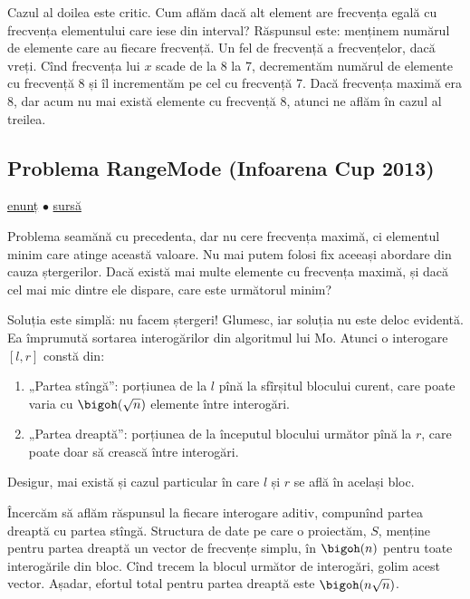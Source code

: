 Cazul al doilea este critic. Cum aflăm dacă alt element are frecvența egală cu frecvența elementului care iese din interval? Răspunsul este: menținem numărul de elemente care au fiecare frecvență. Un fel de frecvență a frecvențelor, dacă vreți.  Cînd frecvența lui $x$ scade de la 8 la 7, decrementăm numărul de elemente cu frecvență 8 și îl incrementăm pe cel cu frecvență 7. Dacă frecvența maximă era 8, dar acum nu mai există elemente cu frecvență 8, atunci ne aflăm în cazul al treilea.

\subsection{Problema RangeMode (Infoarena Cup 2013)}
\label{problem:rangemode}

\href{https://www.infoarena.ro/problema/rangemode}{enunț}
$\bullet$
\hyperref[code:rangemode]{sursă}

Problema seamănă cu precedenta, dar nu cere frecvența maximă, ci elementul minim care atinge această valoare. Nu mai putem folosi fix aceeași abordare din cauza ștergerilor. Dacă există mai multe elemente cu frecvența maximă, și dacă cel mai mic dintre ele dispare, care este următorul minim?

Soluția este simplă: nu facem ștergeri!  Glumesc, iar soluția nu este deloc evidentă. Ea împrumută sortarea interogărilor din algoritmul lui Mo. Atunci o interogare $[l, r]$ constă din:

\begin{enumerate}
  \item „Partea stîngă”: porțiunea de la $l$ pînă la sfîrșitul blocului curent, care poate varia cu $\bigoh(\sqrt{n})$ elemente între interogări.
  \item „Partea dreaptă”: porțiunea de la începutul blocului următor pînă la $r$, care poate doar să crească între interogări.
\end{enumerate}

Desigur, mai există și cazul particular în care $l$ și $r$ se află în același bloc.

Încercăm să aflăm răspunsul la fiecare interogare aditiv, compunînd partea dreaptă cu partea stîngă. Structura de date pe care o proiectăm, $S$, menține pentru partea dreaptă un vector de frecvențe simplu, în $\bigoh(n)$ pentru toate interogările din bloc. Cînd trecem la blocul următor de interogări, golim acest vector. Așadar, efortul total pentru partea dreaptă este $\bigoh(n \sqrt{n})$.

